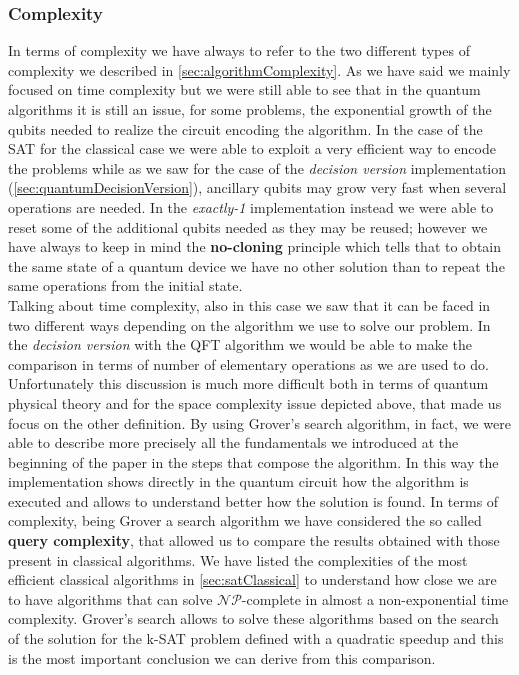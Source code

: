 \documentclass[english]{article}
\begin{document}
			\subsubsection{Complexity}
			\label{sec:complexityComparison}
				In terms of complexity we have always to refer to the two different types of complexity we described in \ref{sec:algorithmComplexity}. As we have said we mainly focused on time complexity but we were still able to see that in the quantum algorithms it is still an issue, for some problems, the exponential growth of the qubits needed to realize the circuit encoding the algorithm. In the case of the SAT for the classical case we were able to exploit a very efficient way to encode the problems while as we saw for the case of the \emph{decision version} implementation (\ref{sec:quantumDecisionVersion}), ancillary qubits may grow very fast when several operations are needed. In the \emph{exactly-1} implementation instead we were able to reset some of the additional qubits needed as they may be reused; however we have always to keep in mind the \textbf{no-cloning} principle which tells that to obtain the same state of a quantum device we have no other solution than to repeat the same operations from the initial state. \\
				
				Talking about time complexity, also in this case we saw that it can be faced in two different ways depending on the algorithm we use to solve our problem. In the \emph{decision version} with the QFT algorithm we would be able to make the comparison in terms of number of elementary operations as we are used to do. Unfortunately this discussion is much more difficult both in terms of quantum physical theory and for the space complexity issue depicted above, that made us focus on the other definition. By using Grover's search algorithm, in fact, we were able to describe more precisely all the fundamentals we introduced at the beginning of the paper in the steps that compose the algorithm. In this way the implementation shows directly in the quantum circuit how the algorithm is executed and allows to understand better how the solution is found. In terms of complexity, being Grover a search algorithm we have considered the so called \textbf{query complexity}, that allowed us to compare the results obtained with those present in classical algorithms. We have listed the complexities of the most efficient classical algorithms in \ref{sec:satClassical} to understand how close we are to have algorithms that can solve $\mathcal{N}\mathcal{P}$-complete in almost a non-exponential time complexity. Grover's search allows to solve these algorithms based on the search of the solution for the k-SAT problem defined with a quadratic speedup and this is the most important conclusion we can derive from this comparison. \\
				
\end{document}

